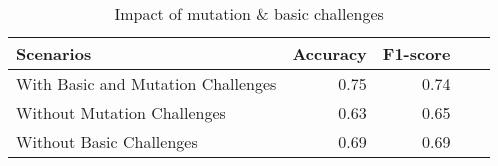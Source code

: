 \begin{table}[]
    \centering
    \caption{Impact of mutation \& basic challenges}
    \label{tab:mutation_impact}
    \begin{tabular}{lrrrr}
         \toprule
         \textbf{Scenarios} & \textbf{Accuracy} & \textbf{F1-score} \\ \midrule
With Basic and Mutation Challenges & 0.75 & 0.74 \\ 
Without Mutation Challenges & 0.63 & 0.65 \\ 
Without Basic Challenges & 0.69 & 0.69 \\ 
\bottomrule
    \end{tabular}
\end{table}